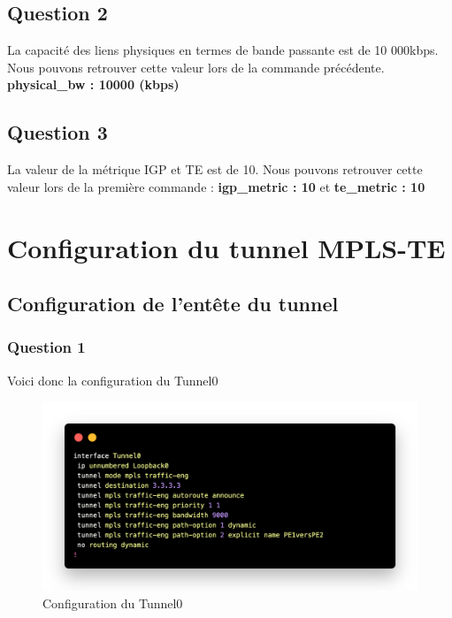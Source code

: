 \documentclass[12pt, a4paper]{article}
\begin{document}
\subsection{Question 2}
La capacité des liens physiques en termes de bande passante est de 10 000kbps. Nous 
pouvons retrouver cette valeur lors de la commande précédente. \textbf{physical\_bw : 10000 (kbps)}

\subsection{Question 3}
La valeur de la métrique IGP et TE est de 10. Nous pouvons retrouver cette valeur lors de la première commande : \textbf{igp\_metric : 10} et \textbf{te\_metric : 10}


\section{Configuration du tunnel MPLS-TE}
\subsection{Configuration de l’entête du tunnel}
\subsubsection{Question 1}
Voici donc la configuration du Tunnel0
\begin{figure}[h]
    \centering
    \includegraphics[width=1\textwidth]{img/code3.png}
    \caption{Configuration du Tunnel0}
    \label{fig:script3}
\end{figure}

\newpage
\end{document}
